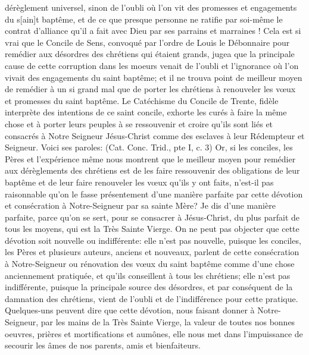 dérèglement universel, sinon de l'oubli où l'on vit des promesses et engagements du s[ain]t baptême, et de ce que
presque personne ne ratifie par soi-même le contrat d'alliance qu'il a fait avec Dieu par ses parrains et marraines !
 Cela est si vrai que le Concile de Sens, convoqué par l'ordre de Louis le Débonnaire pour remédier aux
désordres des chrétiens qui étaient grands, jugea que la principale cause de cette corruption dans les moeurs
venait de l'oubli et l'ignorance où l'on vivait des engagements du saint baptême; et il ne trouva point de meilleur
moyen de remédier à un si grand mal que de porter les chrétiens à renouveler les vœux et promesses du saint
baptême.
 Le Catéchisme du Concile de Trente, fidèle interprète des intentions de ce saint concile, exhorte les curés à
faire la même chose et à porter leurs peuples à se ressouvenir et croire qu'ils sont liés et consacrés à Notre Seigneur Jésus-Christ comme des esclaves à leur Rédempteur et Seigneur. Voici ses paroles:  (Cat. Conc. Trid., pte I, c. 3)
 Or, si les conciles, les Pères et l'expérience même nous montrent que le meilleur moyen pour remédier aux
dérèglements des chrétiens est de les faire ressouvenir des obligations de leur baptême et de leur faire renouveler
les vœux qu'ils y ont faits, n'est-il pas raisonnable qu'on le fasse présentement d'une manière parfaite par cette
dévotion et consécration à Notre-Seigneur par sa sainte Mère? Je dis d'une manière parfaite, parce qu'on se sert,
pour se consacrer à Jésus-Christ, du plus parfait de tous les moyens, qui est la Très Sainte Vierge.
 On ne peut pas objecter que cette dévotion soit nouvelle ou indifférente: elle n'est pas nouvelle, puisque les
conciles, les Pères et plusieurs auteurs, anciens et nouveaux, parlent de cette consécration à Notre-Seigneur ou
rénovation des vœux du saint baptême comme d'une chose anciennement pratiquée, et qu'ils conseillent à tous
les chrétiens; elle n'est pas indifférente, puisque la principale source des désordres, et par conséquent de la
damnation des chrétiens, vient de l'oubli et de l'indifférence pour cette pratique.
 Quelques-uns peuvent dire que cette dévotion, nous faisant donner à Notre-Seigneur, par les mains de la
Très Sainte Vierge, la valeur de toutes nos bonnes oeuvres, prières et mortifications et aumônes, elle nous met
dans l'impuissance de secourir les âmes de nos parents, amis et bienfaiteurs.
